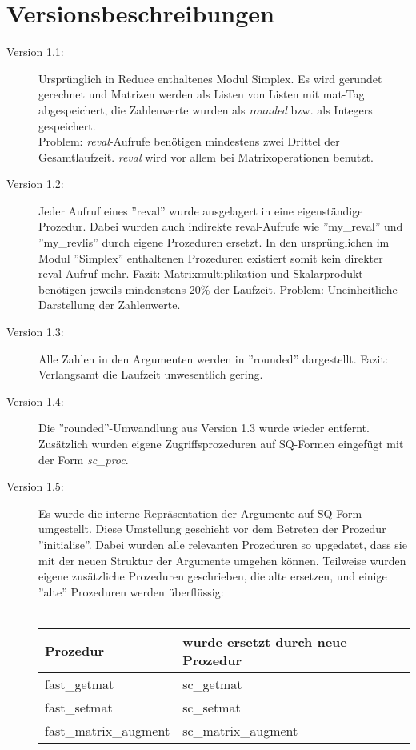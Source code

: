 \documentclass[a4paper]{article}
\begin{document}
\section{Versionsbeschreibungen}
\begin{description}
\item[Version 1.1:]
	Ursprünglich in Reduce enthaltenes Modul Simplex. Es wird gerundet 
	gerechnet und Matrizen werden als Listen von Listen mit mat-Tag 
	abgespeichert, die Zahlenwerte wurden als \textit{rounded} bzw. als 
	Integers gespeichert. \\
	Problem: \textit{reval}-Aufrufe benötigen mindestens zwei Drittel 
	der Gesamtlaufzeit. \textit{reval} wird vor allem bei Matrixoperationen
	benutzt.
\item[Version 1.2:]
	Jeder Aufruf eines ''reval'' wurde ausgelagert in eine 
	eigenständige Prozedur. Dabei wurden auch indirekte reval-Aufrufe 
	wie ''my\_reval'' und ''my\_revlis'' durch eigene Prozeduren ersetzt. 
	In den ursprünglichen im Modul ''Simplex'' enthaltenen Prozeduren 
	existiert somit kein direkter reval-Aufruf mehr. 
  	Fazit: Matrixmultiplikation und Skalarprodukt benötigen jeweils 
	mindenstens 20\% der Laufzeit.
	Problem: Uneinheitliche Darstellung der Zahlenwerte.
\item[Version 1.3:]
	Alle Zahlen in den Argumenten werden in ''rounded'' dargestellt.
	Fazit: Verlangsamt die Laufzeit unwesentlich gering.
\item[Version 1.4:]
	Die ''rounded''-Umwandlung aus Version 1.3 wurde wieder entfernt. 
	Zusätzlich wurden eigene Zugriffsprozeduren auf SQ-Formen eingefügt mit
	der Form \textit{sc\_proc}. 
\item[Version 1.5:]
	Es wurde die interne Repräsentation der Argumente auf SQ-Form 
	umgestellt. Diese Umstellung geschieht vor dem Betreten der Prozedur 
	''initialise''. Dabei wurden alle relevanten Prozeduren so upgedatet, 
	dass sie mit der neuen Struktur der Argumente umgehen können. Teilweise   	wurden eigene zusätzliche Prozeduren geschrieben, die alte ersetzen, 
	und einige ''alte'' Prozeduren werden überflüssig: \\
	\\
	\begin{tabular}{ll}
	Prozedur & wurde ersetzt durch neue Prozedur \\
	\hline
	fast\_getmat & sc\_getmat \\
	fast\_setmat & sc\_setmat \\
	fast\_matrix\_augment & sc\_matrix\_augment \\

\end{tabular}
\end{description}
\end{document}
